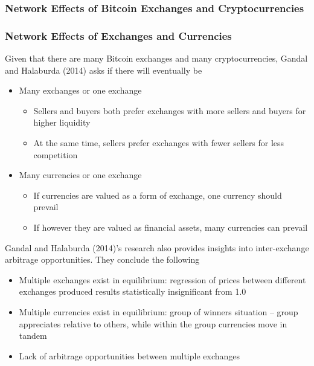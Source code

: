 \documentclass[9pt, compress]{beamer}
\begin{document}
\subsubsection{Network Effects of Bitcoin Exchanges and Cryptocurrencies}
\begin{frame}[fragile]
\frametitle{Network Effects of Exchanges and Currencies}
Given that there are many Bitcoin exchanges and many cryptocurrencies, Gandal and Halaburda (2014) asks if there will eventually be 

\begin{itemize}
\item Many exchanges or one exchange
\begin{itemize}
\item Sellers and buyers both prefer exchanges with more sellers and buyers for higher liquidity
\item At the same time, sellers prefer exchanges with fewer sellers for less competition
\end{itemize}
\item Many currencies or one exchange
\begin{itemize}
\item If currencies are valued as a form of exchange, one currency should prevail
\item If however they are valued as financial assets, many currencies can prevail
\end{itemize}
\end{itemize}
\end{frame}

\begin{frame}[fragile]
Gandal and Halaburda (2014)'s research also provides insights into inter-exchange arbitrage opportunities. They conclude the following

\begin{itemize}
\item Multiple exchanges exist in equilibrium: regression of prices between different exchanges produced results statistically insignificant from 1.0
\item Multiple currencies exist in equilibrium: group of winners situation -- group appreciates relative to others, while within the group currencies move in tandem
\item Lack of arbitrage opportunities between multiple exchanges
\end{itemize}
\end{frame}
\end{document}
